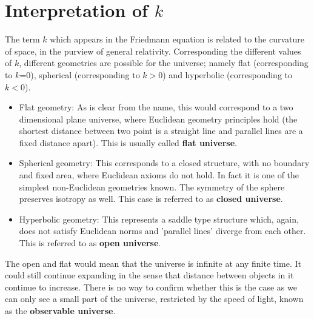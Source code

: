\documentclass{beamer}
\begin{document}
\section{Interpretation of $k$}
\begin{frame}[allowframebreaks]

The term $k$ which appears in the Friedmann equation is related to the curvature of space, in the purview of general relativity. Corresponding the different values of $k$, different geometries are possible for the universe; namely flat (corresponding to $k$=0), spherical (corresponding to $k>0$) and hyperbolic (corresponding to $k<0$).

\begin{itemize}
    \item Flat geometry: As is clear from the name, this would correspond to a two dimensional plane universe, where Euclidean geometry principles hold (the shortest distance between two point is a straight line and parallel lines are a fixed distance apart). This is usually called \textbf{flat universe}.
    \item Spherical geometry: This corresponds to a closed structure, with no boundary and fixed area, where Euclidean axioms do not hold. In fact it is one of the simplest non-Euclidean geometries known. The symmetry of the sphere preserves isotropy as well. This case is referred to as \textbf{closed universe}.
    \item Hyperbolic geometry: This represents a saddle type structure which, again, does not satisfy Euclidean norms and 'parallel lines' diverge from each other. This is referred to as \textbf{open universe}.
\end{itemize}

The open and flat would mean that the universe is infinite at any finite time. It could still continue expanding in the sense that distance between objects in it continue to increase. There is no way to confirm whether this is the case as we can only see a small part of the universe, restricted by the speed of light, known as the \textbf{observable universe}.

\end{frame}
\end{document}
